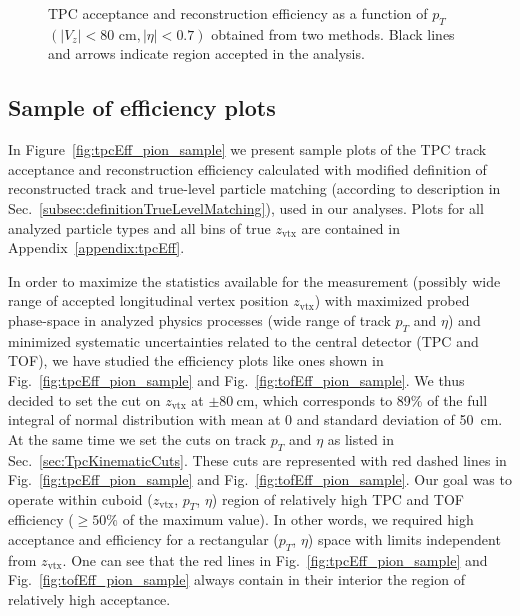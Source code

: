 \begin{figure}[ht]
{	}%
	\caption[TPC acceptance and reconstruction efficiency as a function of $p_T$ $\left(|V_z|<80\textrm{ cm}, |\eta|<0.7\right)$ obtained from two methods.]{TPC acceptance and reconstruction efficiency as a function of $p_T$ $\left(|V_z|<80\textrm{ cm}, |\eta|<0.7\right)$ obtained from two methods. Black lines and arrows indicate region accepted in the analysis.}\label{fig:trackTPCefficiencyComparisonEtaPhi}
\end{figure}


\subsection{Sample of  efficiency plots}\label{subsec:sampleTpcEffPlots}

In Figure~\ref{fig:tpcEff_pion_sample} we present sample plots of the TPC track acceptance and reconstruction efficiency calculated with modified definition of reconstructed track and true-level particle matching (according to description in Sec.~\ref{subsec:definitionTrueLevelMatching}), used in our analyses. Plots for all analyzed particle types and all bins of true $z_{\text{vtx}}$ are contained in Appendix~\ref{appendix:tpcEff}.

In order to maximize the statistics available for the measurement (possibly wide range of accepted longitudinal vertex position $z_{\text{vtx}}$) with maximized probed phase-space in analyzed physics processes (wide range of track $p_{T}$ and $\eta$) and minimized systematic uncertainties related to the central detector (TPC and TOF), we have studied the efficiency plots like ones shown in Fig.~\ref{fig:tpcEff_pion_sample} and Fig.~\ref{fig:tofEff_pion_sample}. We thus decided to set the cut on $z_{\text{vtx}}$ at $\pm80~\text{cm}$, which corresponds to 89\% of the full integral of normal distribution with mean at 0 and standard deviation of 50~cm. At the same time we set the cuts on track $p_{T}$ and $\eta$ as listed in Sec.~\ref{sec:TpcKinematicCuts}. These cuts are represented with red dashed lines in Fig.~\ref{fig:tpcEff_pion_sample} and Fig.~\ref{fig:tofEff_pion_sample}. Our goal was to operate within cuboid ($z_{\text{vtx}}$, $p_{T}$, $\eta$) region of relatively high TPC and TOF efficiency ($\geq50\%$ of the maximum value). In other words, we required high acceptance and efficiency for a rectangular ($p_{T}$, $\eta$) space with limits independent from $z_{\text{vtx}}$. One can see that the red lines in Fig.~\ref{fig:tpcEff_pion_sample} and Fig.~\ref{fig:tofEff_pion_sample} always contain in their interior the region of relatively high acceptance.

